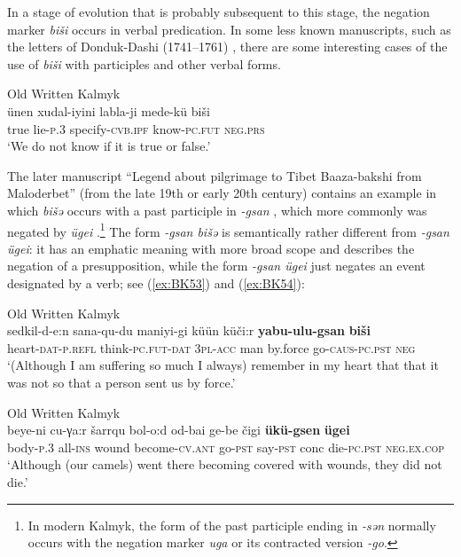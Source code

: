 \documentclass[output=paper]{langsci/langscibook}
\begin{document}
In a stage of evolution that is probably subsequent to this stage, the negation marker \textit{biši} occurs in verbal predication. In some less known manuscripts, such as the letters of Donduk-Dashi (1741–1761) \citep{kokshaeva2011a}, there are some interesting cases of the use of \textit{biši} with participles and other verbal forms.

\ea Old Written Kalmyk \citep[167]{kokshaeva2011a} \label{ex:BK52}\\
	\gll ünen	xudal-iyini	labla-ji			mede-kü			biši\\
	true	lie-\textsc{p.3}	specify-\textsc{cvb.ipf}	know-\textsc{pc.fut}	\textsc{neg.prs}\\
	\glt `We do not know if it is true or false.'
\z


The later manuscript “Legend about pilgrimage to Tibet Baaza-bakshi from Maloderbet” (from the late 19th or early 20th century) contains an example in which \textit{bišǝ} occurs with a past participle in \textit{-gsan} , which more commonly was negated by \textit{ügei} .\footnote{In modern Kalmyk, the form of the past participle ending in \textit{-sən} normally occurs with the negation marker \textit{uga} or its contracted version \textit{-go}.} The form \textit{-gsan bišǝ} is semantically rather different from \textit{-gsan ügei}: it has an emphatic meaning with more broad scope and describes the negation of a presupposition, while the form \textit{-gsan ügei} just negates an event designated by a verb; see (\ref{ex:BK53}) and (\ref{ex:BK54}):

\ea Old Written Kalmyk \citep[103]{bembeev2004a} \label{ex:BK53}\\
	\gll sedkil-d-e:n		sana-qu-du		maniyi-gi	küün	küči:r	\textbf{yabu-ulu-gsan}	\textbf{biši}\\
	heart-\textsc{dat-p.refl}	think-\textsc{pc.fut-dat}	\textsc{3pl-acc} 	man	by.force	go-\textsc{caus-pc.pst}	\textsc{neg}\\
	\glt `(Although I am suffering so much I always) remember in my heart that that it was not so that a person sent us by force.'
\z

\ea Old Written Kalmyk \citep[103]{bembeev2004a} \label{ex:BK54}\\
	\gll beye-ni	cu-γa:r	šarrqu	bol-o:d				od-bai	ge-be	čigi	\textbf{ükü-gsen}	\textbf{ügei}\\
	body-\textsc{p.3} 	all-\textsc{ins}	wound	become-\textsc{cv.ant} 	go-\textsc{pst} say-\textsc{pst}	conc die-\textsc{pc.pst}	\textsc{neg.ex.cop}\\
	\glt `Although (our camels) went there becoming covered with wounds, they did not die.'
\z
\end{document}
